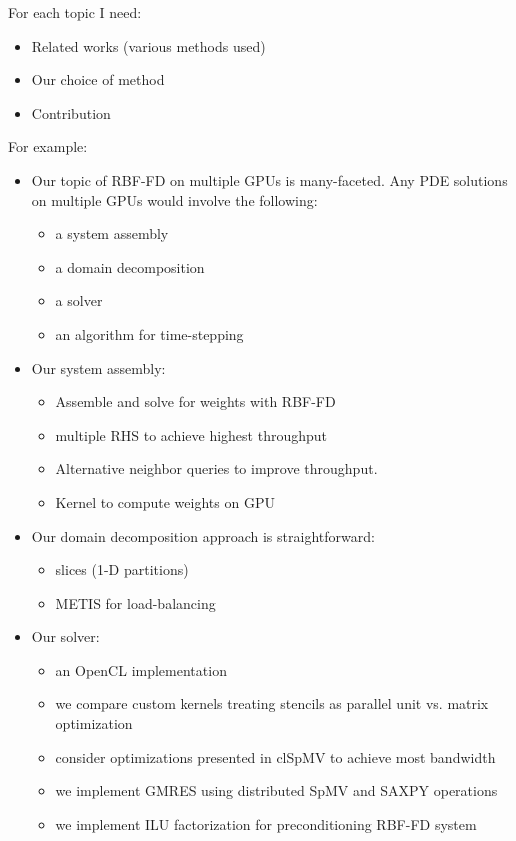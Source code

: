 For each topic I need: 
\begin{itemize} 
\item Related works (various methods used)
\item Our choice of method
\item Contribution
\end{itemize}


For example: 
\begin{itemize} 
\item Our topic of RBF-FD on multiple GPUs is many-faceted. Any PDE solutions on multiple GPUs would involve the following: 
\begin{itemize} 
\item a system assembly
\item a domain decomposition
\item a solver
\item an algorithm for time-stepping
\end{itemize}

\item Our system assembly: 
\begin{itemize} 
\item Assemble and solve for weights with RBF-FD
\item multiple RHS to achieve highest throughput
\item Alternative neighbor queries to improve throughput. 
\item Kernel to compute weights on GPU
\end{itemize}


\item Our domain decomposition approach is straightforward:
\begin{itemize} 
\item slices (1-D partitions)
\item METIS for load-balancing
\end{itemize}


\item Our solver:
\begin{itemize} 
\item an OpenCL implementation
\item we compare custom kernels treating stencils as parallel unit vs. matrix optimization
\item consider optimizations presented in clSpMV to achieve most bandwidth
\item we implement GMRES using distributed SpMV and SAXPY operations
\item we implement ILU factorization for preconditioning RBF-FD system
\end{itemize}



\end{itemize}
